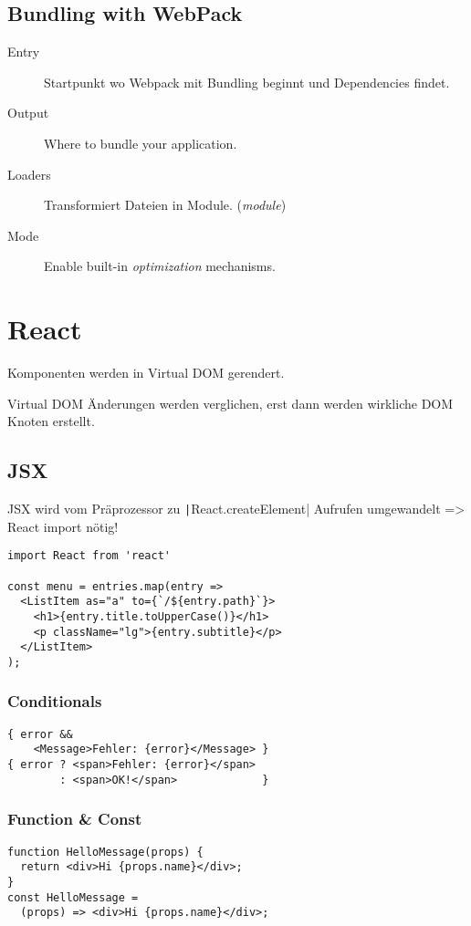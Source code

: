 \begin{multicols*}{4}
\subsection{Bundling with WebPack}
\begin{description}
    \item[Entry] Startpunkt wo Webpack mit Bundling beginnt und
    Dependencies findet.
    \item[Output] Where to bundle your application.
    \item[Loaders] Transformiert Dateien in Module. (\textit{module})
    \item[Mode] Enable built-in \textit{optimization} mechanisms.
\end{description}

\section{React}

Komponenten werden in Virtual DOM gerendert.

Virtual DOM Änderungen werden verglichen, erst dann werden wirkliche DOM Knoten erstellt.

\subsection{JSX}
JSX wird vom Präprozessor zu \texttt|React.createElement| Aufrufen umgewandelt => React import nötig!
\begin{verbatim}
import React from 'react'

const menu = entries.map(entry =>
  <ListItem as="a" to={`/${entry.path}`}>
    <h1>{entry.title.toUpperCase()}</h1>
    <p className="lg">{entry.subtitle}</p>
  </ListItem>
);
\end{verbatim}

\subsubsection{Conditionals}
\begin{verbatim}
{ error &&
    <Message>Fehler: {error}</Message> }
{ error ? <span>Fehler: {error}</span>
        : <span>OK!</span>             }
\end{verbatim}

\subsubsection{Function \& Const}
\begin{verbatim}
function HelloMessage(props) {
  return <div>Hi {props.name}</div>;
}
const HelloMessage =
  (props) => <div>Hi {props.name}</div>;
\end{verbatim}


\end{multicols*}
